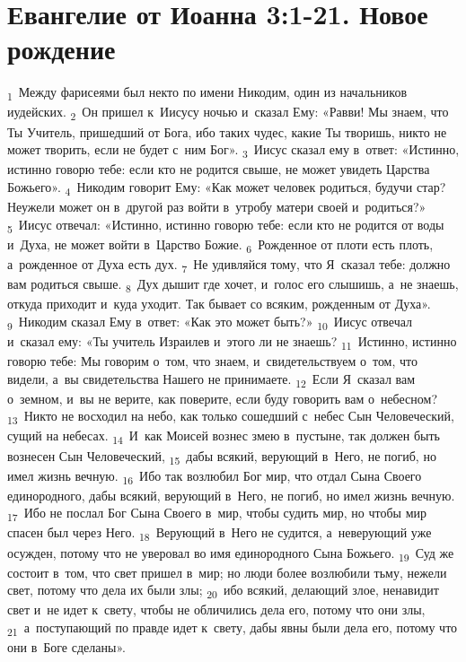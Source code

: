\documentclass[a4paper,12pt]{article}
\begin{document}

\section{Евангелие от Иоанна 3:1-21. Новое рождение}

\textsubscript{1}~Между фарисеями был некто по имени Никодим, один из начальников иудейских. \textsubscript{2}~Он пришел к~Иисусу ночью и~сказал Ему: «Равви! Мы знаем, что Ты Учитель, пришедший от Бога, ибо таких чудес, какие Ты творишь, никто не может творить, если не будет с~ним Бог». \textsubscript{3}~Иисус сказал ему в~ответ: «Истинно, истинно говорю тебе: если кто не родится свыше, не может увидеть Царства Божьего». \textsubscript{4}~Никодим говорит Ему: «Как может человек родиться, будучи стар? Неужели может он в~другой раз войти в~утробу матери своей и~родиться?» \textsubscript{5}~Иисус отвечал: «Истинно, истинно говорю тебе: если кто не родится от воды и~Духа, не может войти в~Царство Божие. \textsubscript{6}~Рожденное от плоти есть плоть, а~рожденное от Духа есть дух. \textsubscript{7}~Не удивляйся тому, что Я~сказал тебе: должно вам родиться свыше. \textsubscript{8}~Дух дышит где хочет, и~голос его слышишь, а~не знаешь, откуда приходит и~куда уходит. Так бывает со всяким, рожденным от Духа». \textsubscript{9}~Никодим сказал Ему в~ответ: «Как это может быть?» \textsubscript{10}~Иисус отвечал и~сказал ему: «Ты учитель Израилев и~этого ли не знаешь? \textsubscript{11}~Истинно, истинно говорю тебе: Мы говорим о~том, что знаем, и~свидетельствуем о~том, что видели, а~вы свидетельства Нашего не принимаете. \textsubscript{12}~Если Я~сказал вам о~земном, и~вы не верите, как поверите, если буду говорить вам о~небесном? \textsubscript{13}~Никто не восходил на небо, как только сошедший с~небес Сын Человеческий, сущий на небесах. \textsubscript{14}~И~как Моисей вознес змею в~пустыне, так должен быть вознесен Сын Человеческий, \textsubscript{15}~дабы всякий, верующий в~Него, не погиб, но имел жизнь вечную. \textsubscript{16}~Ибо так возлюбил Бог мир, что отдал Сына Своего единородного, дабы всякий, верующий в~Него, не погиб, но имел жизнь вечную. \textsubscript{17}~Ибо не послал Бог Сына Своего в~мир, чтобы судить мир, но чтобы мир спасен был через Него. \textsubscript{18}~Верующий в~Него не судится, а~неверующий уже осужден, потому что не уверовал во имя единородного Сына Божьего. \textsubscript{19}~Суд же состоит в~том, что свет пришел в~мир; но люди более возлюбили тьму, нежели свет, потому что дела их были злы; \textsubscript{20}~ибо всякий, делающий злое, ненавидит свет и~не идет к~свету, чтобы не обличились дела его, потому что они злы, \textsubscript{21}~а~поступающий по правде идет к~свету, дабы явны были дела его, потому что они в~Боге сделаны».
\end{document}
